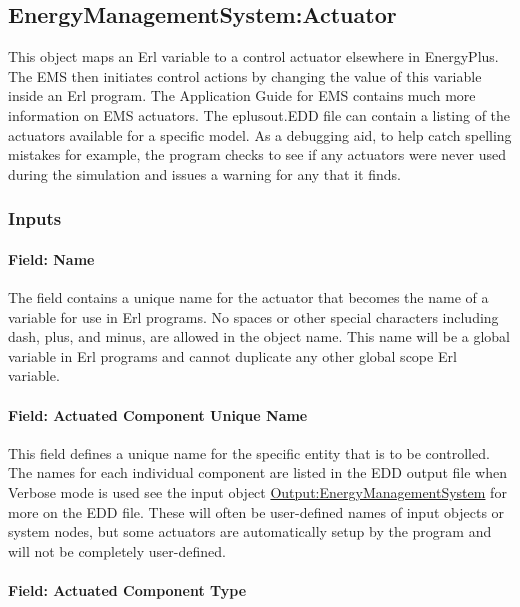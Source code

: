 \subsection{EnergyManagementSystem:Actuator}\label{energymanagementsystemactuator}

This object maps an Erl variable to a control actuator elsewhere in EnergyPlus. The EMS then initiates control actions by changing the value of this variable inside an Erl program. The Application Guide for EMS contains much more information on EMS actuators. The eplusout.EDD file can contain a listing of the actuators available for a specific model.  As a debugging aid, to help catch spelling mistakes for example, the program checks to see if any actuators were never used during the simulation and issues a warning for any that it finds.

\subsubsection{Inputs}\label{inputs-1-013}

\paragraph{Field: Name}\label{field-name-1-012}

The field contains a unique name for the actuator that becomes the name of a variable for use in Erl programs. No spaces or other special characters including dash, plus, and minus, are allowed in the object name. This name will be a global variable in Erl programs and cannot duplicate any other global scope Erl variable.

\paragraph{Field: Actuated Component Unique Name}\label{field-actuated-component-unique-name}

This field defines a unique name for the specific entity that is to be controlled. The names for each individual component are listed in the EDD output file when Verbose mode is used see the input object \hyperref[outputenergymanagementsystem]{Output:EnergyManagementSystem} for more on the EDD file. These will often be user-defined names of input objects or system nodes, but some actuators are automatically setup by the program and will not be completely user-defined.

\paragraph{Field: Actuated Component Type}\label{field-actuated-component-type}


